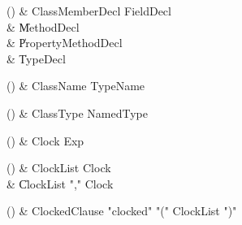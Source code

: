 \begin{bbgrammarappendix}

() & ClassMemberDecl \label{prod:ClassMemberDecl}  \: FieldDecl  \\

 &    \| MethodDecl \\
 &    \| PropertyMethodDecl \\
 &    \| TypeDecl \\

\end{bbgrammarappendix}

\begin{bbgrammarappendix}

() & ClassName \label{prod:ClassName}  \: TypeName  \\


\end{bbgrammarappendix}

\begin{bbgrammarappendix}

() & ClassType \label{prod:ClassType}  \: NamedType  \\


\end{bbgrammarappendix}

\begin{bbgrammarappendix}

() & Clock \label{prod:Clock}  \: Exp  \\


\end{bbgrammarappendix}

\begin{bbgrammarappendix}

() & ClockList \label{prod:ClockList}  \: Clock  \\

 &    \| ClockList \xcd"," Clock \\

\end{bbgrammarappendix}

\begin{bbgrammarappendix}

() & ClockedClause \label{prod:ClockedClause}  \: \xcd"clocked" \xcd"(" ClockList \xcd")"  \\


\end{bbgrammarappendix}

